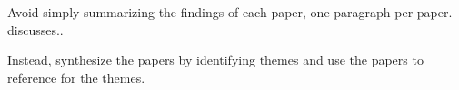 Avoid simply summarizing the findings of each paper, one paragraph per paper. \cite{hosseini2016adaptive} discusses.. 

Instead, synthesize the papers by identifying themes and use the papers to reference for the themes. 

